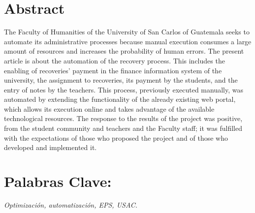 \documentclass[11pt,spanish,Letterpaper,openany]{book}
\begin{document}
\hypertarget{abstract-3}{%
\section*{Abstract}\label{abstract-3}}

The Faculty of Humanities of the University of San Carlos of Guatemala seeks to automate its administrative processes because manual execution consumes a large amount of resources and increases the probability of human errors. The present article is about the automation of the recovery process. This includes the enabling of recoveries' payment in the finance information system of the university, the assignment to recoveries, its payment by the students, and the entry of notes by the teachers. This process, previously executed manually, was automated by extending the functionality of the already existing web portal, which allows its execution online and takes advantage of the available technological resources. The response to the results of the project was positive, from the student community and teachers and the Faculty staff; it was fulfilled with the expectations of those who proposed the project and of those who developed and implemented it.

\hypertarget{palabras-clave-3}{%
\section*{Palabras Clave:}\label{palabras-clave-3}}

\emph{Optimización, automatización, EPS, USAC.}
\end{document}
